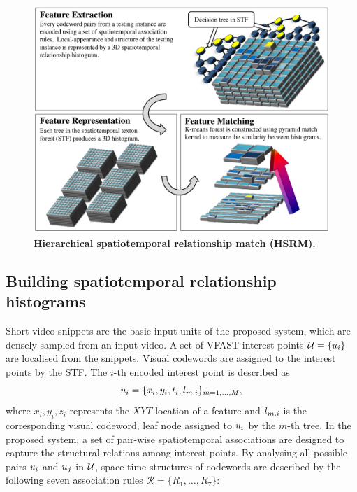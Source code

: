 \begin{figure}[ht]
	\centering	
	\includegraphics[width=0.9\linewidth]{fig/act/fig4_new.pdf} 
	\caption{\textbf{Hierarchical spatiotemporal relationship match (HSRM).}}
	\label{fig/act/hsrm}
\end{figure}

\subsection{Building spatiotemporal relationship histograms}

Short video snippets are the basic input units of the proposed system, which are densely sampled from an input video.  
A set of VFAST interest points $\mathcal{U} = \{u_{i}\}$ are localised from the snippets. Visual codewords are assigned to the interest points by the STF.   
The $i$-th encoded interest point is described as 
\begin{equation}
	u_{i} = \{x_i, y_i, t_i, l_{m,i}\}_{m=1,\dots,M},
\end{equation}
where $x_i, y_i, z_i$ represents the $XYT$-location of a feature and $l_{m,i}$ is the corresponding visual codeword, \ie leaf node assigned to $u_{i}$ by the $m$-th tree. 
In the proposed system, a set of pair-wise spatiotemporal associations are designed to capture the structural relations among interest points. By analysing all possible pairs $u_i$ and $u_j$ in $\mathcal{U}$, space-time structures of codewords are described by the following seven association rules $\mathcal{R} = \{ R_1,\dots,R_7\}$:

